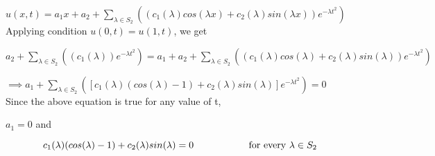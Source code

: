 \documentclass[12pt]{article}
\begin{document}
	$u(x,t) = a_1 x + a_2 + \sum_{\lambda \in S_2}^{}((c_1(\lambda)cos({\lambda x})+c_2(\lambda)sin({\lambda x}))e^{-\lambda t^2})$ \\
	
	Applying condition $u(0,t) = u(1,t)$, we get
	
	$a_2 + \sum_{\lambda \in S_2}^{}((c_1(\lambda))e^{-\lambda t^2}) = a_1 + a_2 + \sum_{\lambda \in S_2}^{}((c_1(\lambda)cos({\lambda })+c_2(\lambda)sin({\lambda}))e^{-\lambda t^2})$
	
	$\implies a_1 + \sum_{\lambda \in S_2}^{}([c_1(\lambda)(cos({\lambda })-1)+c_2(\lambda)sin({\lambda})]e^{-\lambda t^2}) = 0$ \\ 
	
	Since the above equation is true for any value of t, 
	
	\begin{center}
		$a_1 = 0$ \hspace{30mm} and
	\end{center}	
	\begin{equation}
	c_1(\lambda)(cos({\lambda })-1)+c_2(\lambda)sin({\lambda}) = 0 \hspace{20mm}  \text{for every $\lambda \in S_2$}
	\end{equation} 
	
	
	
		
	
	
	
\end{document}
